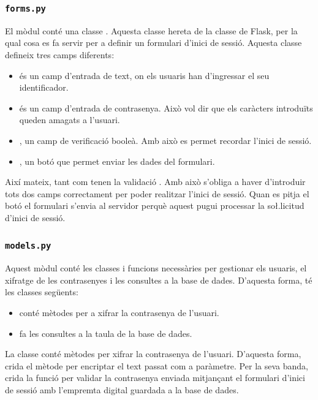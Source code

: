 \documentclass{tfgitic}[2022/06/30]
\begin{document}
\subsubsection{\texttt{forms.py}}
El mòdul  conté una classe . Aquesta classe hereta de la classe  de Flask, per la qual cosa es fa servir per a definir un formulari d'inici de sessió. Aquesta classe defineix tres camps diferents:

\begin{itemize}
    \item {} és un camp d'entrada de text, on els usuaris han d'ingressar el seu identificador.
    \item {} és un camp d'entrada de contrasenya. Això vol dir que els caràcters introduïts queden amagats a l'usuari.
    \item {}, un camp de verificació booleà. Amb això es permet recordar l'inici de sessió.
    \item {}, un botó que permet enviar les dades del formulari.
\end{itemize}

Així mateix, tant  com  tenen la validació . Amb això s'obliga a haver d'introduir tots dos camps correctament per poder realitzar l'inici de sessió. Quan es pitja el botó  el formulari s'envia al servidor perquè aquest pugui processar la so\l.licitud d'inici de sessió.

\subsubsection{\texttt{models.py}}
Aquest mòdul conté les classes i funcions necessàries per gestionar els usuaris, el xifratge de les contrasenyes i les consultes a la base de dades. D'aquesta forma,  té les classes següents:

\begin{itemize}
    \item {} conté mètodes per a xifrar la contrasenya de l'usuari.
    \item {} fa les consultes a la taula  de la base de dades.
\end{itemize}

La classe  conté mètodes per xifrar la contrasenya de l'usuari. D'aquesta forma,  crida el mètode  per encriptar el text passat com a paràmetre. Per la seva banda,  crida la funció  per validar la contrasenya enviada mitjançant el formulari d'inici de sessió amb l'empremta digital guardada a la base de dades.
\end{document}
